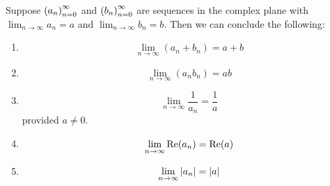 \documentclass{refbook}
\begin{document}
\begin{theorem}
Suppose $\left({a}_n\right)^\infty_{n=0}$ and $\left({b}_n\right)^\infty_{n=0}$ are sequences in the complex plane with $\lim_{n\to\infty} a_n =a$ and $\lim_{n\to\infty} b_n = b$. Then we can conclude the following:
\begin{enumerate}
\item $$\lim_{n\to\infty} (a_n+b_n) = a+b$$
\item $$\lim_{n\to\infty} (a_nb_n) = ab$$
\item $$\lim_{n\to\infty} \frac{1}{a_n} = \frac{1}{a}$$ provided $a \neq 0$.
\item $$\lim_{n\to\infty} \operatorname{Re}({a_n}) = \operatorname{Re}({a})$$
\item $$\lim_{n\to\infty} \left\lvert a_n \right\rvert = \left\lvert a \right\rvert$$
\end{enumerate}
\end{theorem}
\end{document}
